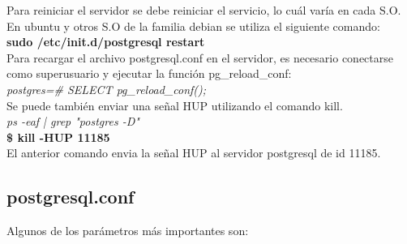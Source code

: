 Para reiniciar el servidor se debe reiniciar el servicio, lo cuál varía en cada S.O. En ubuntu y otros S.O de la familia debian se utiliza el siguiente comando:\\

\textbf{sudo /etc/init.d/postgresql restart}\\

Para recargar el archivo postgresql.conf en el servidor, es necesario conectarse como superusuario y  ejecutar la función pg\_reload\_conf:\\

\textit{postgres=\# SELECT pg\_reload\_conf();}\\

Se puede también enviar una señal HUP utilizando el comando kill.\\

\textit{ps -eaf | grep "postgres -D"}\\

\textbf{\$ kill -HUP 11185}\\

El anterior comando envia la señal HUP al servidor postgresql de id 11185.

\subsection{postgresql.conf}

Algunos de los parámetros más importantes son:

